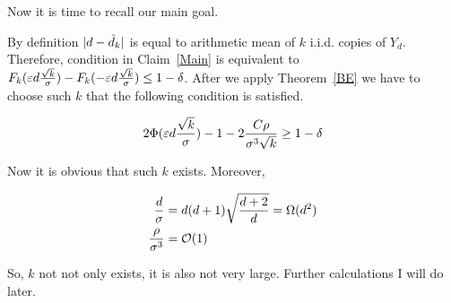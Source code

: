 Now it is time to recall our main goal.

By definition $\lvert d - \hat d_k\rvert$ is equal to arithmetic mean of $k$ i.i.d. copies of $Y_d$. Therefore, condition in Claim~\ref{Main} is equivalent to $F_k(\varepsilon d \frac{\sqrt{k}}{\sigma}) - F_k(- \varepsilon d \frac{\sqrt{k}}{\sigma}) \leq 1 - \delta$. After we apply Theorem~\ref{BE} we have to choose such $k$ that the following condition is satisfied.

\begin{equation}
	2 \Phi(\varepsilon d \frac{\sqrt{k}}{\sigma}) - 1 - 2\frac{C \rho}{\sigma^3 \sqrt{k}} \geq 1 - \delta
\end{equation}

Now it is obvious that such $k$ exists. Moreover,

\begin{align*}
	\frac{d}{\sigma} & = d(d + 1)\sqrt{\frac{d + 2}{d}} = \Omega(d^2) \\
	\frac{\rho}{\sigma^3} & = \mathcal{O}(1)
\end{align*}

So, $k$ not not only exists, it is also not very large. Further calculations I will do later.
